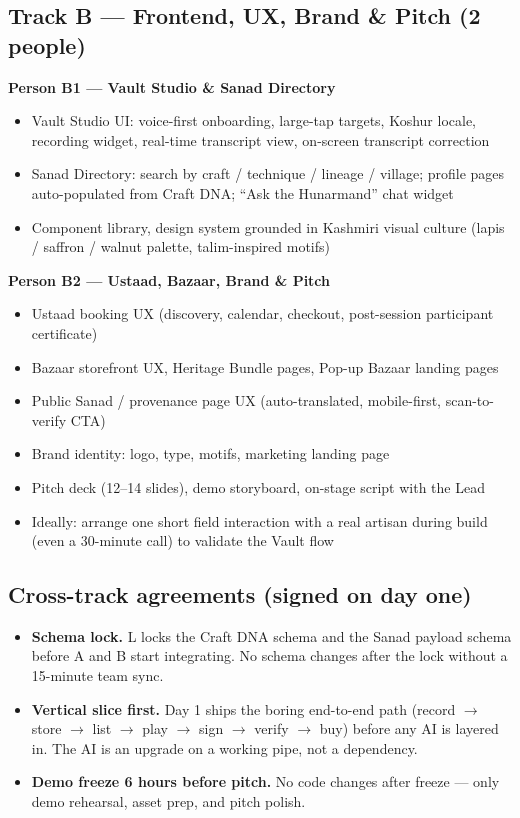 \documentclass[11pt, a4paper]{article}
\begin{document}
\subsection{Track B --- Frontend, UX, Brand \& Pitch (2 people)}

\textbf{Person B1 --- Vault Studio \& Sanad Directory}
\begin{itemize}
  \item Vault Studio UI: voice-first onboarding, large-tap targets, Koshur locale, recording widget, real-time transcript view, on-screen transcript correction
  \item Sanad Directory: search by craft / technique / lineage / village; profile pages auto-populated from Craft DNA; ``Ask the Hunarmand'' chat widget
  \item Component library, design system grounded in Kashmiri visual culture (lapis / saffron / walnut palette, talim-inspired motifs)
\end{itemize}

\textbf{Person B2 --- Ustaad, Bazaar, Brand \& Pitch}
\begin{itemize}
  \item Ustaad booking UX (discovery, calendar, checkout, post-session participant certificate)
  \item Bazaar storefront UX, Heritage Bundle pages, Pop-up Bazaar landing pages
  \item Public Sanad / provenance page UX (auto-translated, mobile-first, scan-to-verify CTA)
  \item Brand identity: logo, type, motifs, marketing landing page
  \item Pitch deck (12--14 slides), demo storyboard, on-stage script with the Lead
  \item Ideally: arrange one short field interaction with a real artisan during build (even a 30-minute call) to validate the Vault flow
\end{itemize}

\subsection{Cross-track agreements (signed on day one)}

\begin{itemize}
  \item \textbf{Schema lock.} L locks the Craft DNA schema and the Sanad payload schema before A and B start integrating. No schema changes after the lock without a 15-minute team sync.
  \item \textbf{Vertical slice first.} Day 1 ships the boring end-to-end path (record $\to$ store $\to$ list $\to$ play $\to$ sign $\to$ verify $\to$ buy) before any AI is layered in. The AI is an upgrade on a working pipe, not a dependency.
  \item \textbf{Demo freeze 6 hours before pitch.} No code changes after freeze --- only demo rehearsal, asset prep, and pitch polish.
\end{itemize}
\end{document}
